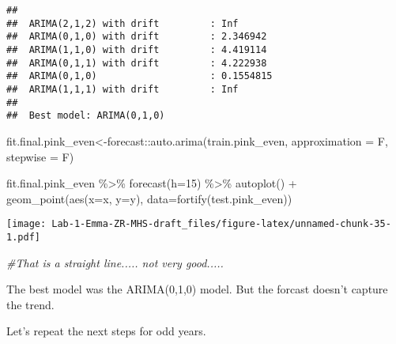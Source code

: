 \documentclass[
]{article}
\newenvironment{Shaded}{\begin{snugshade}}{\end{snugshade}}
\newcommand{\AttributeTok}[1]{\textcolor[rgb]{0.77,0.63,0.00}{#1}}
\newcommand{\CommentTok}[1]{\textcolor[rgb]{0.56,0.35,0.01}{\textit{#1}}}
\newcommand{\DecValTok}[1]{\textcolor[rgb]{0.00,0.00,0.81}{#1}}
\newcommand{\FloatTok}[1]{\textcolor[rgb]{0.00,0.00,0.81}{#1}}
\newcommand{\FunctionTok}[1]{\textcolor[rgb]{0.00,0.00,0.00}{#1}}
\newcommand{\NormalTok}[1]{#1}
\newcommand{\OtherTok}[1]{\textcolor[rgb]{0.56,0.35,0.01}{#1}}
\newcommand{\SpecialCharTok}[1]{\textcolor[rgb]{0.00,0.00,0.00}{#1}}
\begin{document}
\begin{verbatim}
## 
##  ARIMA(2,1,2) with drift         : Inf
##  ARIMA(0,1,0) with drift         : 2.346942
##  ARIMA(1,1,0) with drift         : 4.419114
##  ARIMA(0,1,1) with drift         : 4.222938
##  ARIMA(0,1,0)                    : 0.1554815
##  ARIMA(1,1,1) with drift         : Inf
## 
##  Best model: ARIMA(0,1,0)
\end{verbatim}

\begin{Shaded}
\begin{Highlighting}[]
\NormalTok{fit.final.pink\_even}\OtherTok{\textless{}{-}}\NormalTok{forecast}\SpecialCharTok{::}\FunctionTok{auto.arima}\NormalTok{(train.pink\_even, }\AttributeTok{approximation =}\NormalTok{ F, }\AttributeTok{stepwise =}\NormalTok{ F)}

\NormalTok{fit.final.pink\_even }\SpecialCharTok{\%\textgreater{}\%}
  \FunctionTok{forecast}\NormalTok{(}\AttributeTok{h=}\DecValTok{15}\NormalTok{) }\SpecialCharTok{\%\textgreater{}\%}
  \FunctionTok{autoplot}\NormalTok{() }\SpecialCharTok{+} \FunctionTok{geom\_point}\NormalTok{(}\FunctionTok{aes}\NormalTok{(}\AttributeTok{x=}\NormalTok{x, }\AttributeTok{y=}\NormalTok{y), }\AttributeTok{data=}\FunctionTok{fortify}\NormalTok{(test.pink\_even))}
\end{Highlighting}
\end{Shaded}

\texttt{[image: Lab-1-Emma-ZR-MHS-draft\_files/figure-latex/unnamed-chunk-35-1.pdf]}

\begin{Shaded}
\begin{Highlighting}[]
\CommentTok{\#That is a straight line..... not very good.....}
\end{Highlighting}
\end{Shaded}

The best model was the ARIMA(0,1,0) model. But the forcast doesn't
capture the trend.

Let's repeat the next steps for odd years.

\begin{Shaded}
\end{Shaded}
\end{document}
